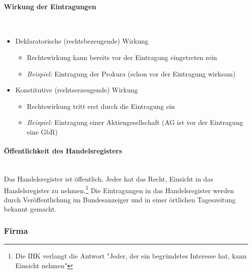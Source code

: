 \paragraph{Wirkung der Eintragungen}~\\
\begin{itemize}
	\item Deklaratorische (rechtsbezeugende) Wirkung
	\begin{itemize}
		\item Rechtswirkung kann bereits vor der Eintragung eingetreten sein
		\item {\it Beispiel:} Eintragung der Prokura (schon vor der Eintragung wirksam)
	\end{itemize}
	\item Konstitutive (rechtserzeugende) Wirkung
	\begin{itemize}
		\item Rechtswirkung tritt erst durch die Eintragung ein
		\item {\it Beispiel:} Eintragung einer Aktiengesellschaft (AG ist vor der Eintragung eine GbR)
	\end{itemize}
\end{itemize}

\paragraph{Öffentlichkeit des Handelsregisters}~\\
Das Handelsregister ist öffentlich. Jeder hat das Recht, Einsicht in das Handelsregister zu nehmen.\footnote{\label{foot:1}Die IHK verlangt die Antwort "Jeder, der ein begründetes Interesse hat, kann Einsicht nehmen"} Die Eintragungen in das Handelsregister werden durch Veröffentlichung im Bundesanzeiger und in einer örtlichen Tageszeitung bekannt gemacht.\\

\subsubsection{Firma}

